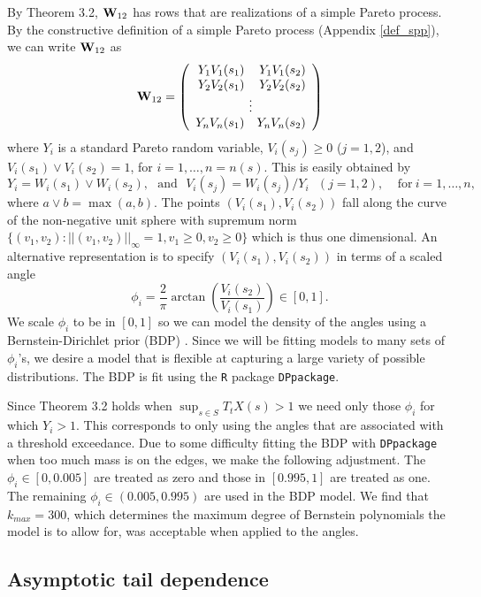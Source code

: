 By Theorem 3.2, $\mathbf{\bm{W}}_{12}$ has rows that are realizations of a simple Pareto process. By the constructive definition of a simple Pareto process (Appendix \ref{def_spp}), we can write $\mathbf{\bm{W}}_{12}$ as
\[ \m{W}_{12} = \left(\begin{array}{rr} Y_1V_1(s_1) & Y_1V_1(s_2) \\ Y_2V_2(s_1) & Y_2V_2(s_2) \\ \multicolumn{2}{c}{\vdots} \\ Y_nV_n(s_1) & Y_nV_n(s_2) \end{array}\right) \]
where $Y_i$ is a standard Pareto random variable, $V_i(s_j)\geq 0$ ($j=1,2$), and $V_i(s_1) \vee V_i(s_2) = 1$, for $i=1,\ldots,n=n(s)$. This is easily obtained by
\[ Y_i = W_i(s_1) \vee W_i(s_2),~~~\mathrm{and}~~~ V_i(s_j) = W_i(s_j) / Y_i ~~~ (j=1,2),~~~~~\mathrm{for~}i=1,\ldots,n, \]
where $a \vee b=\max(a,b)$. The points $(V_i(s_1), V_i(s_2))$ fall along the curve of the non-negative unit sphere with supremum norm $\{(v_1, v_2):||(v_1,v_2)||_\infty=1, v_1\geq0,v_2\geq0\}$ which is thus one dimensional. An alternative representation is to specify $(V_i(s_1), V_i(s_2))$ in terms of a scaled angle
\[ \phi_i = \frac{2}{\pi}\arctan\left(\frac{V_i(s_2)}{V_i(s_1)}\right)\in[0,1]. \]
We scale $\phi_i$ to be in $[0,1]$ so we can model the density of the angles using a Bernstein-Dirichlet prior (BDP) \citep{petrone1999bayesian}. Since we will be fitting models to many sets of $\phi_i$'s, we desire a model that is flexible at capturing a large variety of possible distributions. The BDP is fit using the \texttt{R} package \texttt{DPpackage}.

Since Theorem 3.2 holds when $\sup_{s\in S}T_t X(s) > 1$ we need only those $\phi_i$ for which $Y_i>1$. This corresponds to only using the angles that are associated with a threshold exceedance. Due to some difficulty fitting the BDP with \texttt{DPpackage} when too much mass is on the edges, we make the following adjustment. The $\phi_i\in[0, 0.005]$ are treated as zero and those in $[0.995, 1]$ are treated as one. The remaining $\phi_i\in(0.005, 0.995)$ are used in the BDP model. We find that $k_{max}=300$, which determines the maximum degree of Bernstein polynomials the model is to allow for, was acceptable when applied to the angles.



\subsection{Asymptotic tail dependence}
\label{asy_tail}


